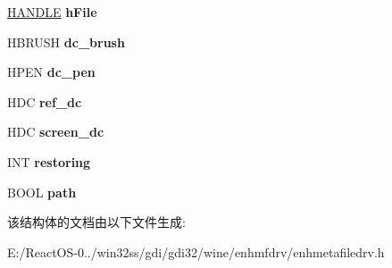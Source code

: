 \begin{DoxyCompactItemize}
\hyperlink{interfacevoid}{H\+A\+N\+D\+LE} {\bfseries h\+File}
\item 
\mbox{\label{struct_e_m_f_d_r_v___p_d_e_v_i_c_e_afaa41f6579f18d390d0a1dc7f78543d0}} 
H\+B\+R\+U\+SH {\bfseries dc\+\_\+brush}
\item 
\mbox{\label{struct_e_m_f_d_r_v___p_d_e_v_i_c_e_a22415b179620790d911d5de363645141}} 
H\+P\+EN {\bfseries dc\+\_\+pen}
\item 
\mbox{\label{struct_e_m_f_d_r_v___p_d_e_v_i_c_e_a932ef05febda1d9fb8ceb7839f45fe9c}} 
H\+DC {\bfseries ref\+\_\+dc}
\item 
\mbox{\label{struct_e_m_f_d_r_v___p_d_e_v_i_c_e_a9eb54ae8a273eebcb1c2d54a36176296}} 
H\+DC {\bfseries screen\+\_\+dc}
\item 
\mbox{\label{struct_e_m_f_d_r_v___p_d_e_v_i_c_e_a7af9c9304b4f22c65f3c1d0139f8343e}} 
I\+NT {\bfseries restoring}
\item 
\mbox{\label{struct_e_m_f_d_r_v___p_d_e_v_i_c_e_a59873a83c7efcaa795e1bbae7c326a60}} 
B\+O\+OL {\bfseries path}
\end{DoxyCompactItemize}


该结构体的文档由以下文件生成\+:\begin{DoxyCompactItemize}
\item 
E\+:/\+React\+O\+S-\/0../win32ss/gdi/gdi32/wine/enhmfdrv/enhmetafiledrv.\+h\end{DoxyCompactItemize}
